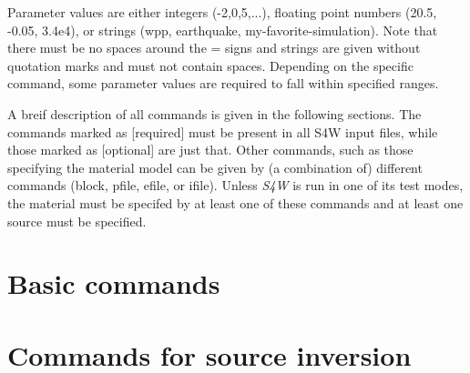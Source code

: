 \documentclass[11pt]{report}
\begin{document}
Parameter values are either integers (-2,0,5,...), floating point numbers (20.5, -0.05, 3.4e4), or strings
(wpp, earthquake, my-favorite-simulation). Note that there must be no spaces around the = signs and
strings are given without quotation marks and must not contain spaces. Depending on the specific
command, some parameter values are required to fall within specified ranges.

A breif description of all commands is given in the following sections. The commands marked as
[required] must be present in all S4W input files, while those marked as [optional] are just
that. Other commands, such as those specifying the material model can be given by (a combination of)
different commands (block, pfile, efile, or ifile). Unless \emph{S4W} is run in one of its test
modes, the material must be specifed by at least one of these commands and at least one source must
be specified.


\section{Basic commands}

\section{Commands for source inversion}
\end{document}
